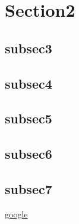 \documentclass[twoside,15pt]{article}
\begin{document}
\section{Section2}
\subsection{subsec3}\label{subsec:zagyva}
\begin{verse}
\hulipsum[2]
\end{verse}
\subsection{subsec4}
\subsection{subsec5}
\subsection{subsec6}
\subsection{subsec7}
\href{https://www.google.com}{google}
\end{document}
